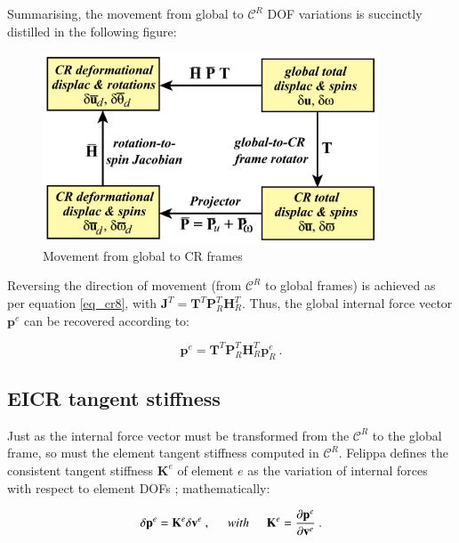 Summarising, the movement from global to $\mathscr{C}^R$ DOF variations is succinctly distilled in the following figure:

\begin{figure}[H]
	\centering
	\def\svgwidth{\columnwidth}
	\includegraphics[width=10cm]{images/cr_6.png}
	\caption{Movement from global to CR frames \cite{felippa2005unified}}
	\label{cr6}
\end{figure}

Reversing the direction of movement (from $\mathscr{C}^R$ to global frames) is achieved as per equation \ref{eq_cr8}, with $\mathbf{J}^T = \mathbf{T}^T \mathbf{P}_R^T \mathbf{H}_R^T$. Thus, the global internal force vector $\mathbf{p}^e$ can be recovered according to:

\begin{equation} 
\mathbf{p}^e
=
\mathbf{T}^T \mathbf{P}_R^T \mathbf{H}_R^T
\mathbf{p}_R^e
\label{eq_cr10}\ .
\end{equation}
 
 \subsection{EICR tangent stiffness}
 Just as the internal force vector must be transformed from the $\mathscr{C}^R$ to the global frame, so must the element tangent stiffness computed in $\mathscr{C}^R$. Felippa defines the consistent tangent stiffness $\mathbf{K}^e$ of element $e$ as the variation of internal forces with respect to element DOFs \cite{felippa2005unified}; mathematically:
 
 \begin{equation} 
\delta \mathbf{p}^e
 =
\mathbf{K}^e \delta \mathbf{v}^e\ ,
\hspace{5mm}
with
\hspace{5mm}
\mathbf{K}^e = 
\frac{\partial \mathbf{p}^e}{\partial \mathbf{v}^e}
 \label{eq_cr11}\ .
 \end{equation}
 
